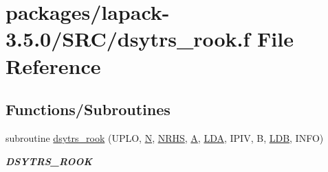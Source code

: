 \hypertarget{dsytrs__rook_8f}{}\section{packages/lapack-\/3.5.0/\+S\+R\+C/dsytrs\+\_\+rook.f File Reference}
\label{dsytrs__rook_8f}
\subsection*{Functions/\+Subroutines}
\begin{DoxyCompactItemize}
\item 
subroutine \hyperlink{group__doubleSYcomputational_ga6d55e54d7ae1c8d61d1fce586fac675f}{dsytrs\+\_\+rook} (U\+P\+L\+O, \hyperlink{polmisc_8c_a0240ac851181b84ac374872dc5434ee4}{N}, \hyperlink{example__user_8c_aa0138da002ce2a90360df2f521eb3198}{N\+R\+H\+S}, \hyperlink{classA}{A}, \hyperlink{example__user_8c_ae946da542ce0db94dced19b2ecefd1aa}{L\+D\+A}, I\+P\+I\+V, B, \hyperlink{example__user_8c_a50e90a7104df172b5a89a06c47fcca04}{L\+D\+B}, I\+N\+F\+O)
\begin{DoxyCompactList}\small\item\em {\bfseries D\+S\+Y\+T\+R\+S\+\_\+\+R\+O\+O\+K} \end{DoxyCompactList}\end{DoxyCompactItemize}
